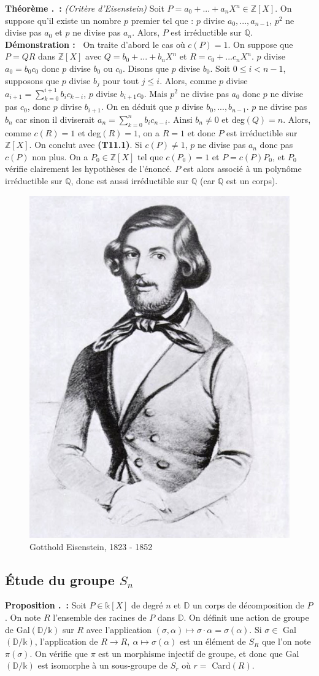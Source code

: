 \documentclass[5pt,a4paper]{article}
\newcounter{prop}[section]
\newcounter{thm}[section]
\renewcommand{\theprop}{\thesection.\arabic{prop}}
\renewcommand{\thethm}{\thesection.\arabic{thm}}
\newcommand{\prop}[1]{\stepcounter{prop}\noindent\textbf{Proposition \theprop ~:} #1 \newline}
\newcommand{\thm}[1]{\stepcounter{thm}\noindent\textbf{Théorème \thethm ~:} #1 \newline}
\newcommand{\demo}[1]{\textbf{Démonstration :~} #1 \newline}
\begin{document}
\begin{onehalfspacing}
\thm{\textit{(Critère d'Eisenstein)} Soit $P = a_0 + ... + a_nX^n \in \mathbb{Z}[X]$. On suppose qu'il existe un nombre $p$ premier tel que : $p$ divise $a_0, ..., a_{n-1}$, $p^2$ ne divise pas $a_0$ et $p$ ne divise pas $a_n$. Alors, $P$ est irréductible sur $\mathbb{Q}$.}
\demo{ On traite d'abord le cas où $c(P) = 1$. On suppose que $P = QR$ dans $\mathbb{Z}[X]$ avec $Q = b_0 + ... + b_nX^n$ et $R = c_0 + ... c_nX^n$. $p$ divise $a_0 = b_0c_0$ donc $p$ divise $b_0$ ou $c_0$. Disons que $p$ divise $b_0$. Soit $0 \leq i < n - 1$, supposons que $p$ divise $b_j$ pour tout $j \leq i$. Alors, comme $p$ divise $a_{i+1} = \displaystyle{\sum_{k=0}^{i+1} b_ic_{k-i}}$, $p$ divise $b_{i+1}c_0$. Mais $p^2$ ne divise pas $a_0$ donc $p$ ne divise pas $c_0$, donc $p$ divise $b_{i+1}$. On en déduit que $p$ divise $b_0, ..., b_{n-1}$. $p$ ne divise pas $b_n$ car sinon il diviserait $a_n = \sum_{k=0}^{n} b_ic_{n-i}$. Ainsi $b_n \neq 0$ et deg$(Q) = n$. Alors, comme $c(R) = 1$ et deg$(R) = 1$, on a $R = 1$ et donc $P$ est irréductible sur $\mathbb{Z}[X]$. On conclut avec \textbf{(T11.1)}. Si $c(P) \neq 1$, $p$ ne divise pas $a_n$ donc pas $c(P)$ non plus. On a $P_0 \in \mathbb{Z}[X]$ tel que $c(P_0) = 1$ et $P = c(P)P_0$, et $P_0$ vérifie clairement les hypothèses de l'énoncé. $P$ est alors associé à un polynôme irréductible sur $\mathbb{Q}$, donc est aussi irréductible sur $\mathbb{Q}$ (car $\mathbb{Q}$ est un corps).}


\begin{figure}[!h]
\centering
\includegraphics[width = 0.33\linewidth]{ressources/eisenstein.jpeg}
\caption{Gotthold Eisenstein, 1823 - 1852}
\end{figure}


\subsection{Étude du groupe $S_n$}


\prop{Soit $P \in \mathds{k}[X]$ de degré $n$ et $\mathbb{D}$ un corps de décomposition de $P$. On note $R$ l'ensemble des racines de $P$ dans $\mathbb{D}$. On définit une action de groupe de Gal$(\mathbb{D}/\mathds{k})$ sur $R$ avec l'application $(\sigma, \alpha) \mapsto \sigma\cdot\alpha = \sigma(\alpha)$. Si $\sigma \in$ Gal$(\mathbb{D}/\mathds{k})$, l'application de $R \rightarrow R,~\alpha \mapsto \sigma(\alpha)$ est un élément de $S_R$ que l'on note $\pi(\sigma)$. On vérifie que $\pi$ est un morphisme injectif de groupe, et donc que Gal$(\mathbb{D}/\mathds{k})$ est isomorphe à un sous-groupe de $S_r$ où $r =$ Card$(R)$.}



\end{onehalfspacing}
\end{document}
